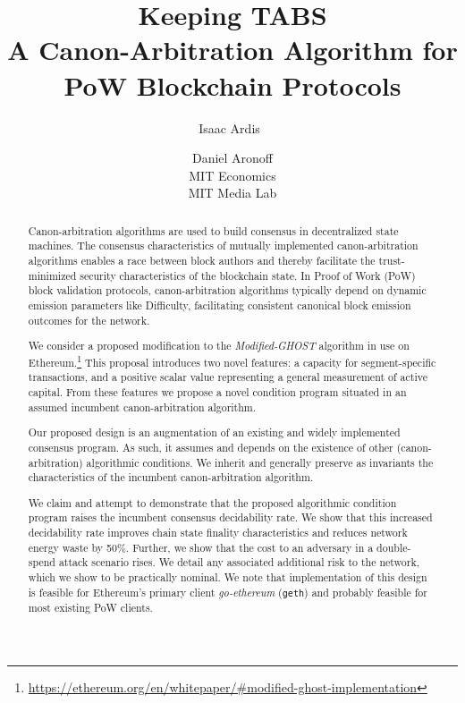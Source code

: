 \documentclass[11pt]{article}
\title{\textbf{Keeping TABS}\\
\small{A Canon-Arbitration Algorithm for \mghost PoW Blockchain Protocols}}
\author{Isaac Ardis\
\and Daniel Aronoff\\\small{MIT Economics}\\\small{MIT Media Lab}}
\theoremstyle{plain}
\newcommand{\mghost}{\textit{Modified-GHOST }}
\begin{document}

\maketitle
\begin{abstract}

Canon-arbitration algorithms are used to build consensus in decentralized
state machines.
The consensus characteristics of mutually implemented canon-arbitration
algorithms enables a race between block authors and thereby facilitate
the trust-minimized security characteristics of the blockchain state.
In Proof of Work (PoW) block validation protocols, canon-arbitration
algorithms typically depend on dynamic emission parameters like Difficulty,
facilitating consistent canonical block emission outcomes for the network.

We consider a proposed modification to the \mghost algorithm in use on
Ethereum.\footnote{\url{https://ethereum.org/en/whitepaper/#modified-ghost-implementation}}
This proposal introduces two novel features: a capacity for segment-specific
transactions, and a positive scalar value representing a general measurement of
active capital.
From these features we propose a novel condition program situated in an assumed
incumbent canon-arbitration algorithm.

Our proposed design is an augmentation of an existing and widely implemented consensus program.
As such, it assumes and depends on the existence of other (canon-arbitration)
algorithmic conditions.
We inherit and generally preserve as invariants the characteristics of the incumbent canon-arbitration algorithm.

We claim and attempt to demonstrate that the proposed algorithmic condition
program raises the incumbent consensus decidability rate.
We show that this increased decidability rate improves chain state finality
characteristics and reduces network energy waste by 50\%.
Further, we show that the cost to an adversary in a double-spend attack scenario rises.
We detail any associated additional risk to the network, which we show to
be practically nominal.
We note that implementation of this design is feasible for Ethereum's
primary client \textit{go-ethereum} (\texttt{geth}) and probably feasible for
most existing PoW clients.

\end{abstract}

\pagebreak
\end{document}
